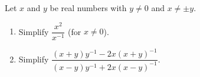 Let $x$ and $y$ be real numbers with $y\ne0$ and $x\ne\pm y$.
\begin{enumerate}
\item[(a)] Simplify $\dfrac{x^2}{x^{-1}}$ (for $x\ne0$).
\item[(b)] Simplify $\dfrac{(x+y)y^{-1}-2x(x+y)^{-1}}{(x-y)y^{-1}+2x(x-y)^{-1}}$.
\end{enumerate}
